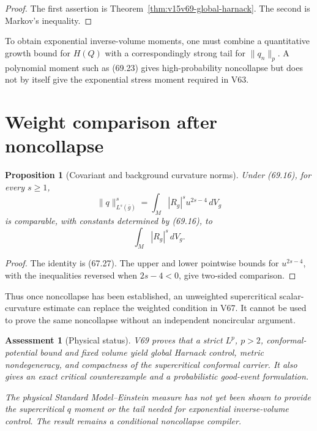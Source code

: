 \documentclass[11pt]{article}
\newtheorem{proposition}[theorem]{Proposition}
\newtheorem{assessment}[theorem]{Assessment}
\theoremstyle{remark}
\begin{document}
\begin{proof}
The first assertion is
Theorem~\ref{thm:v15v69-global-harnack}.  The second is Markov's
inequality.
\end{proof}

To obtain exponential inverse-volume moments, one must combine a
quantitative growth bound for \(H(Q)\) with a correspondingly
strong tail for \(\|q_n\|_p\).  A polynomial moment such as
(69.23) gives high-probability noncollapse but does not by itself
give the exponential stress moment required in V63.

\section{Weight comparison after noncollapse}

\begin{proposition}[Covariant and background curvature norms]
\label{prop:v15v69-weight}
Under (69.16), for every \(s\geq1\),
\[
 \|q\|_{L^s(\bar g)}^s
 =
 \int_M|R_g|^su^{2s-4}\,dV_g                         \tag{69.25}
\]
is comparable, with constants determined by (69.16), to
\[
 \int_M|R_g|^s\,dV_g.                                 \tag{69.26}
\]
\end{proposition}

\begin{proof}
The identity is (67.27).  The upper and lower pointwise bounds for
\(u^{2s-4}\), with the inequalities reversed when \(2s-4<0\),
give two-sided comparison.
\end{proof}

Thus once noncollapse has been established, an unweighted
supercritical scalar-curvature estimate can replace the weighted
condition in V67.  It cannot be used to prove the same noncollapse
without an independent noncircular argument.

\begin{assessment}[Physical status]
\label{ass:v15v69-status}
V69 proves that a strict \(L^p\), \(p>2\), conformal-potential bound
and fixed volume yield global Harnack control, metric
nondegeneracy, and compactness of the supercritical conformal
carrier.  It also gives an exact critical counterexample and a
probabilistic good-event formulation.

The physical Standard Model--Einstein measure has not yet been
shown to provide the supercritical \(q\) moment or the tail needed
for exponential inverse-volume control.  The result remains a
conditional noncollapse compiler.
\end{assessment}
\end{document}
